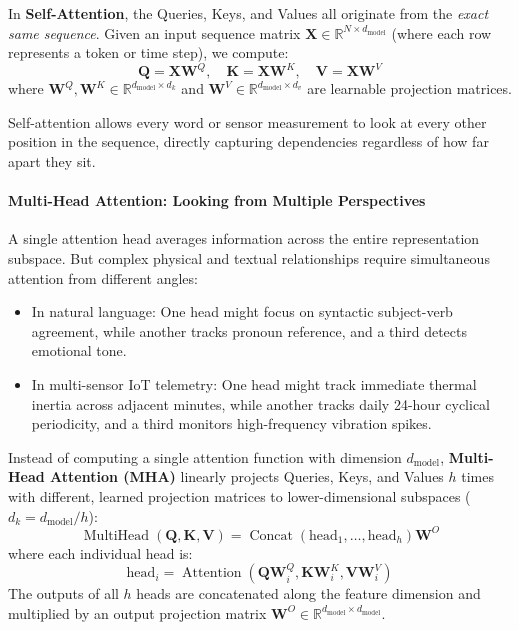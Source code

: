 In \textbf{Self-Attention}, the Queries, Keys, and Values all originate from the \emph{exact same sequence}. Given an input sequence matrix $\mathbf{X} \in \mathbb{R}^{N \times d_{\text{model}}}$ (where each row represents a token or time step), we compute:
\begin{equation}
\mathbf{Q} = \mathbf{X}\mathbf{W}^Q, \quad \mathbf{K} = \mathbf{X}\mathbf{W}^K, \quad \mathbf{V} = \mathbf{X}\mathbf{W}^V\label{eq:qkv_projections}
\end{equation}
where $\mathbf{W}^Q, \mathbf{W}^K \in \mathbb{R}^{d_{\text{model}} \times d_k}$ and $\mathbf{W}^V \in \mathbb{R}^{d_{\text{model}} \times d_v}$ are learnable projection matrices. 

Self-attention allows every word or sensor measurement to look at every other position in the sequence, directly capturing dependencies regardless of how far apart they sit.

\paragraph{Multi-Head Attention: Looking from Multiple Perspectives}
A single attention head averages information across the entire representation subspace. But complex physical and textual relationships require simultaneous attention from different angles:
\begin{itemize}
    \item In natural language: One head might focus on syntactic subject-verb agreement, while another tracks pronoun reference, and a third detects emotional tone.
    \item In multi-sensor IoT telemetry: One head might track immediate thermal inertia across adjacent minutes, while another tracks daily 24-hour cyclical periodicity, and a third monitors high-frequency vibration spikes.
\end{itemize}

Instead of computing a single attention function with dimension $d_{\text{model}}$, \textbf{Multi-Head Attention (MHA)} linearly projects Queries, Keys, and Values $h$ times with different, learned projection matrices to lower-dimensional subspaces ($d_k = d_{\text{model}} / h$):
\begin{equation}
\operatorname{MultiHead}(\mathbf{Q}, \mathbf{K}, \mathbf{V}) = \operatorname{Concat}(\text{head}_1, \dots, \text{head}_h)\mathbf{W}^O\label{eq:multihead_eq}
\end{equation}
where each individual head is:
\begin{equation}
\text{head}_i = \operatorname{Attention}(\mathbf{Q}\mathbf{W}_i^Q, \mathbf{K}\mathbf{W}_i^K, \mathbf{V}\mathbf{W}_i^V)\label{eq:head_i}
\end{equation}
The outputs of all $h$ heads are concatenated along the feature dimension and multiplied by an output projection matrix $\mathbf{W}^O \in \mathbb{R}^{d_{\text{model}} \times d_{\text{model}}}$. 

